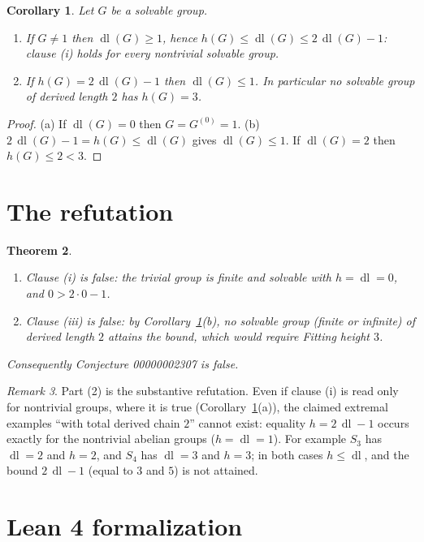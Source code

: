 \documentclass[11pt]{article}
\newtheorem{theorem}{Theorem}
\newtheorem{corollary}[theorem]{Corollary}
\theoremstyle{definition}
\theoremstyle{remark}
\newtheorem{remark}[theorem]{Remark}
\renewcommand{\_}{\oldus\allowbreak}
\newcommand{\dl}{\operatorname{dl}}
\begin{document}
\begin{corollary}\label{cor}
Let $G$ be a solvable group.
\begin{enumerate}[label=(\alph*)]
  \item If $G \ne 1$ then $\dl(G)\ge 1$, hence $h(G) \le \dl(G) \le 2\,\dl(G) - 1$: clause (i) holds for
        every nontrivial solvable group.
  \item If $h(G) = 2\,\dl(G) - 1$ then $\dl(G) \le 1$. In particular no solvable group of derived length $2$
        has $h(G) = 3$.
\end{enumerate}
\end{corollary}

\begin{proof}
(a) If $\dl(G) = 0$ then $G = G^{(0)} = 1$. (b) $2\,\dl(G) - 1 = h(G) \le \dl(G)$ gives $\dl(G)\le 1$.
If $\dl(G) = 2$ then $h(G) \le 2 < 3$.
\end{proof}

\section{The refutation}

\begin{theorem}\label{thm:refute}
\begin{enumerate}[label=(\arabic*)]
  \item Clause (i) is false: the trivial group is finite and solvable with $h = \dl = 0$, and
        $0 > 2\cdot 0 - 1$.
  \item Clause (iii) is false: by Corollary~\ref{cor}(b), no solvable group (finite or infinite) of derived
        length $2$ attains the bound, which would require Fitting height $3$.
\end{enumerate}
Consequently Conjecture 00000002307 is false.
\end{theorem}

\begin{remark}
Part (2) is the substantive refutation. Even if clause (i) is read only for nontrivial groups, where it is
true (Corollary~\ref{cor}(a)), the claimed extremal examples ``with total derived chain $2$'' cannot exist:
equality $h = 2\,\dl - 1$ occurs exactly for the nontrivial abelian groups ($h = \dl = 1$). For example $S_3$
has $\dl = 2$ and $h = 2$, and $S_4$ has $\dl = 3$ and $h = 3$; in both cases $h \le \dl$, and the bound
$2\,\dl - 1$ (equal to $3$ and $5$) is not attained.
\end{remark}

\section{Lean 4 formalization}
\end{document}
